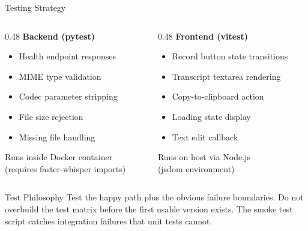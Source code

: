 \documentclass{beamer}
\begin{document}
\begin{frame}{Testing Strategy}
    \small
    \begin{columns}[T]
        \begin{column}{0.48\textwidth}
            \textbf{Backend (pytest)}
            \begin{itemize}\setlength{\itemsep}{0pt}
                \item Health endpoint responses
                \item MIME type validation
                \item Codec parameter stripping
                \item File size rejection
                \item Missing file handling
            \end{itemize}
            \vspace{0.2em}
            {\scriptsize Runs inside Docker container\\(requires faster-whisper imports)}
        \end{column}
        \begin{column}{0.48\textwidth}
            \textbf{Frontend (vitest)}
            \begin{itemize}\setlength{\itemsep}{0pt}
                \item Record button state transitions
                \item Transcript textarea rendering
                \item Copy-to-clipboard action
                \item Loading state display
                \item Text edit callback
            \end{itemize}
            \vspace{0.2em}
            {\scriptsize Runs on host via Node.js\\(jsdom environment)}
        \end{column}
    \end{columns}

    \vspace{0.3em}
    \begin{block}{Test Philosophy}
        Test the happy path plus the obvious failure boundaries.
        Do not overbuild the test matrix before the first usable
        version exists. The smoke test script catches integration
        failures that unit tests cannot.
    \end{block}
\end{frame}
\end{document}
